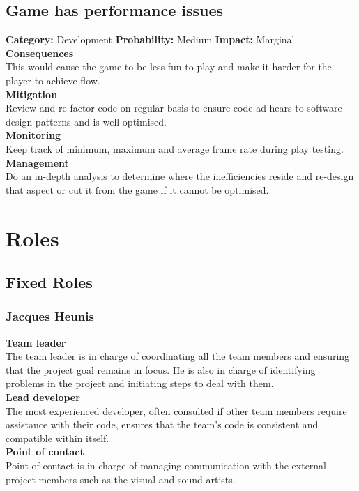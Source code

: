 \documentclass[a4paper,10pt]{article}
\begin{document}
\subsection{Game has performance issues}
\textbf{Category:} Development\newline
\textbf{Probability:} Medium\newline
\textbf{Impact:} Marginal
\\\textbf{Consequences}\\
This would cause the game to be less fun to play and make it harder for the player to achieve flow.
\smallskip\\\textbf{Mitigation}\\
Review and re-factor code on regular basis to ensure code ad-hears to software design patterns and is well optimised.\smallskip\\\textbf{Monitoring}\\
Keep track of minimum, maximum and average frame rate during play testing.
\smallskip\\\textbf{Management}\\
Do an in-depth analysis to determine where the inefficiencies reside and re-design that aspect or cut it from the game if it cannot be optimised.

\section{Roles}
\subsection{Fixed Roles}
\subsubsection{Jacques Heunis}
\textbf{Team leader}\\
The team leader is in charge of coordinating all the team members and ensuring that the project goal remains in focus. He is also in charge of identifying problems in the project and initiating steps to deal with them.
\smallskip\\
\textbf{Lead developer}\\
The most experienced developer, often consulted if other team members require assistance with their code, ensures that the team's code is consistent and compatible within itself.
\smallskip\\
\textbf{Point of contact}\\
Point of contact is in charge of managing communication with the external project members such as the visual and sound artists.
\end{document}
